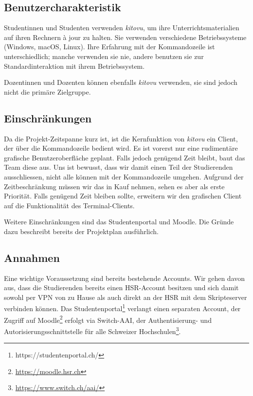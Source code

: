 \documentclass[a4paper]{article}
\begin{document}
\subsection{Benutzercharakteristik}
Studentinnen und Studenten verwenden \emph{kitovu}, um ihre Unterrichtsmaterialien auf ihren Rechnern à jour zu halten. Sie verwenden verschiedene Betriebssysteme (Windows, macOS, Linux). Ihre Erfahrung mit der Kommandozeile ist unterschiedlich; manche verwenden sie nie, andere benutzen sie zur Standardinteraktion mit ihrem Betriebssystem.

Dozentinnen und Dozenten können ebenfalls \emph{kitovu} verwenden, sie sind jedoch nicht die primäre Zielgruppe.

\subsection{Einschränkungen}
Da die Projekt-Zeitspanne kurz ist, ist die Kernfunktion von \emph{kitovu} ein Client, der über die Kommandozeile bedient wird. Es ist vorerst nur eine rudimentäre grafische Benutzeroberfläche geplant. Falls jedoch genügend Zeit bleibt, baut das Team diese aus. Uns ist bewusst, dass wir damit einen Teil der Studierenden ausschliessen, nicht alle können mit der Kommandozeile umgehen. Aufgrund der Zeitbeschränkung müssen wir das in Kauf nehmen, sehen es aber als erste Priorität. Falls genügend Zeit bleiben sollte, erweitern wir den grafischen Client auf die Funktionalität des Terminal-Clients.

Weitere Einschränkungen sind das Studentenportal und Moodle. Die Gründe dazu beschreibt bereits der Projektplan ausführlich.


\subsection{Annahmen}
Eine wichtige Voraussetzung sind bereits bestehende Accounts. Wir gehen davon aus, dass die Studierenden bereits einen HSR-Account besitzen und sich damit sowohl per VPN von zu Hause als auch direkt an der HSR mit dem Skripteserver verbinden können. Das Studentenportal\footnote{https://studentenportal.ch/} verlangt einen separaten Account, der Zugriff auf Moodle\footnote{\url{https://moodle.hsr.ch}} erfolgt via Switch-AAI, der Authentisierung- und Autorisierungsschnittstelle für alle Schweizer Hochschulen\footnote{\url{https://www.switch.ch/aai/}}.
\end{document}
